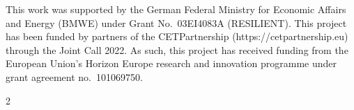 \documentclass[a0,portrait]{a0poster}
\newlength{\leftbleed}
\begin{document}
\noindent
\begin{minipage}[t]{0.31\linewidth}
  \vspace{0pt}
  {\singlespacing\scriptsize This work was supported by the German Federal Ministry for Economic Affairs and Energy (BMWE) under Grant No.\ 03EI4083A (RESILIENT). This project has been funded by partners of the CETPartnership (https://cetpartnership.eu) through the Joint Call 2022. As such, this project has received funding from the European Union's Horizon Europe research and innovation programme under grant agreement no.\ 101069750.\par}
\end{minipage}\hfill
\begin{minipage}[t]{0.66\linewidth}
  \vspace{0pt}
  \singlespacing\scriptsize
  \setlength{\columnsep}{2em}
  \setlength{\multicolsep}{0pt}
  \begin{multicols}{2}
    \renewcommand{\section}[2]{}%
    \setlength{\itemsep}{0pt}%
    \makeatletter\def\@openbib@code{\setlength{\topsep}{0pt}\setlength{\partopsep}{0pt}\setlength{\itemsep}{0.15em}}\makeatother
    
    
  \end{multicols}
\end{minipage}

\end{document}
